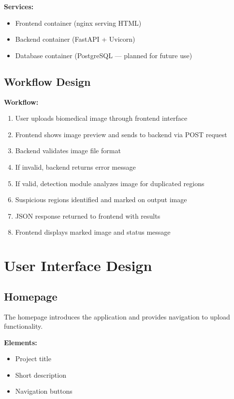 \documentclass[12pt]{article}
\begin{document}
\textbf{Services:}
\begin{itemize}[noitemsep]
    \item Frontend container (nginx serving HTML)
    \item Backend container (FastAPI + Uvicorn)
    \item Database container (PostgreSQL --- planned for future use)
\end{itemize}

\subsection{Workflow Design}

\textbf{Workflow:}
\begin{enumerate}[noitemsep]
    \item User uploads biomedical image through frontend interface
    \item Frontend shows image preview and sends to backend via POST request
    \item Backend validates image file format
    \item If invalid, backend returns error message
    \item If valid, detection module analyzes image for duplicated regions
    \item Suspicious regions identified and marked on output image
    \item JSON response returned to frontend with results
    \item Frontend displays marked image and status message
\end{enumerate}

\section{User Interface Design}

\subsection{Homepage}

The homepage introduces the application and provides navigation to upload functionality.

\textbf{Elements:}
\begin{itemize}[noitemsep]
    \item Project title
    \item Short description
    \item Navigation buttons
\end{itemize}
\end{document}
